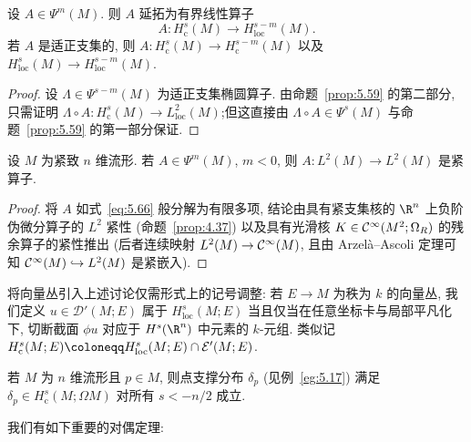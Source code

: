 \begin{corollary}\label{cor:5.60}
设 $A \in \Psi^m(M)$. 则 $A$ 延拓为有界线性算子
\begin{equation}\label{eq:5.144}
    A \colon H_{\mathrm{c}}^s(M) \to H_{\mathrm{loc}}^{s-m}(M).
\end{equation}
若 $A$ 是适正支集的, 则 $A \colon H_{\mathrm{c}}^s(M) \to H_{\mathrm{c}}^{s-m}(M)$ 以及 $H_{\mathrm{loc}}^s(M) \to H_{\mathrm{loc}}^{s-m}(M)$.
\end{corollary}

\begin{proof}
设 $\Lambda \in \Psi^{s-m}(M)$ 为适正支集椭圆算子. 由命题~\ref{prop:5.59} 的第二部分, 只需证明 $\Lambda \circ A \colon H_{\mathrm{c}}^s(M) \to L_{\mathrm{loc}}^2(M)$;但这直接由 $\Lambda \circ A \in \Psi^s(M)$ 与命题~\ref{prop:5.59} 的第一部分保证.
\end{proof}

\begin{proposition}[负阶伪微分算子的紧性]\label{prop:5.61}
设 $M$ 为紧致 $n$ 维流形. 若 $A \in \Psi^m(M)$, $m < 0$, 则 $A \colon L^2(M) \to L^2(M)$ 是紧算子.
\end{proposition}

\begin{proof}
将 $A$ 如式~\eqref{eq:5.66} 般分解为有限多项, 结论由具有紧支集核的 $\R^n$ 上负阶伪微分算子的 $L^2$ 紧性 (命题~\ref{prop:4.37}) 以及具有光滑核 $K \in \mathcal{C}^\infty(M^2; \Omega_R)$ 的残余算子的紧性推出 (后者连续映射 $L^2(M) \to \mathcal{C}^\infty(M)$, 且由 Arzelà--Ascoli 定理可知 $\mathcal{C}^\infty(M) \hookrightarrow L^2(M)$ 是紧嵌入).
\end{proof}

将向量丛引入上述讨论仅需形式上的记号调整: 若 $E \to M$ 为秩为 $k$ 的向量丛, 我们定义 $u \in \mathcal{D}'(M; E)$ 属于 $H_{\mathrm{loc}}^s(M; E)$ 当且仅当在任意坐标卡与局部平凡化下, 切断截面 $\phi u$ 对应于 $H^s(\R^n)$ 中元素的 $k$-元组. 类似记 $H_{\mathrm{c}}^s(M; E) \defeq H_{\mathrm{loc}}^s(M; E) \cap \mathcal{E}'(M; E)$.

\begin{example}\label{eg:5.62}
若 $M$ 为 $n$ 维流形且 $p \in M$, 则点支撑分布 $\delta_p$ (见例~\ref{eg:5.17}) 满足 $\delta_p \in H_{\mathrm{c}}^s(M; \Omega M)$ 对所有 $s < -n/2$ 成立.
\end{example}

我们有如下重要的对偶定理:


